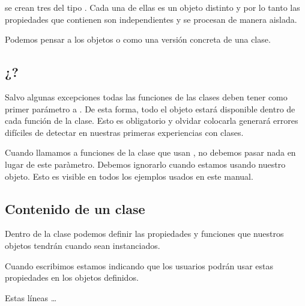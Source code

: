 \documentclass[a4paper,12pt,spanish]{sphinxmanual}
\begin{document}
\sphinxAtStartPar
se crean tres  del tipo . Cada una de ellas es un objeto distinto y por
lo tanto las propiedades que contienen son independientes y se procesan de manera aislada.

\begin{sphinxVerbatim}[commandchars=\\\{\}]
\end{sphinxVerbatim}

\sphinxAtStartPar
Podemos pensar a los objetos o  como una versión concreta de una clase.


\subsection{¿?}
\label{\detokenize{class:self}}
\sphinxAtStartPar
Salvo algunas excepciones todas las funciones de las clases deben tener como primer
parámetro a . De esta forma, todo el objeto estará disponible dentro de cada
función de la clase. Esto es obligatorio y olvidar colocarla generará errores difíciles
de detectar en nuestras primeras experiencias con clases.

\sphinxAtStartPar
Cuando llamamos a funciones de la clase que usan , no debemos pasar nada en
lugar de este paràmetro. Debemos ignorarlo cuando estamos usando nuestro objeto.
Esto es visible en todos los ejemplos usados en este manual.


\subsection{Contenido de un clase}
\label{\detokenize{class:contenido-de-un-clase}}
\sphinxAtStartPar
Dentro de la clase podemos definir las propiedades y funciones que nuestros objetos tendrán
cuando sean instanciados.

\sphinxAtStartPar
Cuando escribimos  estamos indicando que los usuarios podrán usar
estas propiedades en los objetos definidos.

\sphinxAtStartPar
Estas líneas …
\end{document}
